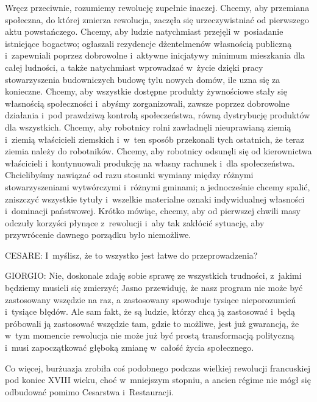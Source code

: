 \documentclass[oneside,polish,11pt,sfheadings]{mwbk}
\begin{document}
 
Wręcz przeciwnie, rozumiemy rewolucję zupełnie inaczej. Chcemy, aby przemiana społeczna, do której zmierza rewolucja,
zaczęła się urzeczywistniać od pierwszego aktu powstańczego.  Chcemy, aby ludzie natychmiast przejęli w~posiadanie
istniejące bogactwo; ogłaszali rezydencje dżentelmenów własnością publiczną i~zapewniali poprzez dobrowolne i~aktywne
inicjatywy minimum mieszkania dla całej ludności, a także natychmiast wprowadzać w~życie dzięki pracy stowarzyszenia
budowniczych budowę tylu nowych domów, ile uzna się za konieczne. Chcemy, aby wszystkie dostępne produkty żywnościowe
stały się własnością społeczności i~abyśmy zorganizowali, zawsze poprzez dobrowolne działania i~pod prawdziwą kontrolą
społeczeństwa, równą dystrybucję produktów dla wszystkich. Chcemy, aby robotnicy rolni zawładnęli nieuprawianą ziemią i~ziemią właścicieli ziemskich i~w~ten sposób przekonali tych ostatnich, że teraz ziemia należy do robotników. Chcemy,
aby robotnicy odsunęli się od kierownictwa właścicieli i~kontynuowali produkcję na własny rachunek i~dla społeczeństwa.
Chcielibyśmy nawiązać od razu stosunki wymiany między różnymi stowarzyszeniami wytwórczymi i~różnymi gminami; a
jednocześnie chcemy spalić, zniszczyć wszystkie tytuły i~wszelkie materialne oznaki indywidualnej własności i~dominacji
państwowej. Krótko mówiąc, chcemy, aby od pierwszej chwili masy odczuły korzyści płynące z~rewolucji i~aby tak zakłócić
sytuację, aby przywrócenie dawnego porządku było niemożliwe. 




 
\noindent CESARE: I~myślisz, że to wszystko jest łatwe do przeprowadzenia?  




 
\noindent GIORGIO: Nie, doskonale zdaję sobie sprawę ze wszystkich trudności, z~jakimi będziemy musieli się zmierzyć; Jasno
przewiduję, że nasz program nie może być zastosowany wszędzie na raz, a zastosowany spowoduje tysiące nieporozumień i~tysiące błędów. Ale sam fakt, że są ludzie, którzy chcą ją zastosować i~będą próbowali ją zastosować wszędzie tam,
gdzie to możliwe, jest już gwarancją, że w~tym momencie rewolucja nie może już być prostą transformacją polityczną i~musi zapoczątkować głęboką zmianę w~całość życia społecznego. 

 
Co więcej, burżuazja zrobiła coś podobnego podczas wielkiej rewolucji francuskiej pod koniec XVIII wieku, choć w~mniejszym stopniu, a ancien régime nie mógł się odbudować pomimo Cesarstwa i~Restauracji. 
\end{document}
